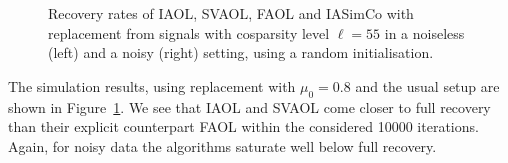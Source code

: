 \documentclass[11pt, onecolumn, journal,compsoc]{IEEEtran}
\theoremstyle{plain}
\theoremstyle{remark}
\begin{document}
\begin{figure}
	\caption{Recovery rates of IAOL, SVAOL, FAOL and IASimCo with replacement from signals with cosparsity level $\ell=55$ in a noiseless (left) and a noisy (right) setting, using a random initialisation.}
	\label{fig:ReplacementBackward}
\end{figure}
%
 The simulation results, using replacement with $\mu_0=0.8$ and the usual setup are shown in Figure~\ref{fig:ReplacementBackward}. We see that IAOL and SVAOL come closer to full recovery than their explicit counterpart FAOL within the considered 10000 iterations. Again, for noisy data the algorithms saturate well below full recovery.

\end{document}
